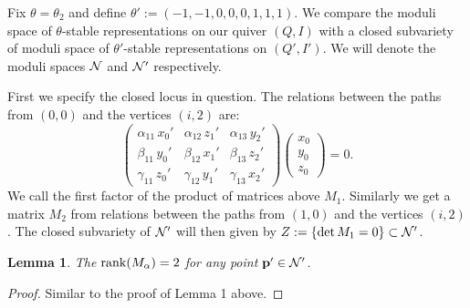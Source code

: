 \documentclass{amsart}
\newtheorem{lem}[thm]{Lemma}
\theoremstyle{definition}
\begin{document}
Fix $\theta= \theta_2$ and define $\theta':= (-1,-1,0,0,0,1,1,1)$. 
We compare the moduli space of $\theta$-stable representations on our quiver $(Q,I)$ with a closed subvariety of moduli space of $\theta'$-stable representations on $(Q',I')$.
We will denote the moduli spaces $\mathcal{N}$ and $\mathcal{N}'$ respectively.

First we specify the closed locus in question.
The relations between the paths from $(0,0)$ and the vertices $(i,2)$ are:
\begin{equation}\label{eq:z}
    \begin{pmatrix}
    \alpha_{11}\, x_0' & \alpha_{12}\, z_1' & \alpha_{13}\, y_2' \\
    \beta_{11}\, y_0' & \beta_{12}\, x_1' & \beta_{13}\, z_2' \\
    \gamma_{11}\, z_0' & \gamma_{12}\, y_1' & \gamma_{13}\, x_2'
\end{pmatrix} \begin{pmatrix}
    x_0 \\ y_0 \\ z_0
\end{pmatrix} =0.
\end{equation}
We call the first factor of the product of matrices above $M_1$.
Similarly we get a matrix $M_2$ from relations between the paths from $(1,0)$ and the vertices $(i,2)$.
The closed subvariety of $\mathcal{N}'$ will then given by $Z:= \{\operatorname{det} M_1=0\} \subset \mathcal{N}'$.


\begin{lem}\label{lm:rank}
The $\operatorname{rank}(M_\alpha) = 2$ for any point $\mathbf{p}' \in \mathcal{N}'$.
\end{lem}

\begin{proof}
Similar to the proof of Lemma 1 above.
%
%
\end{proof}
\end{document}
